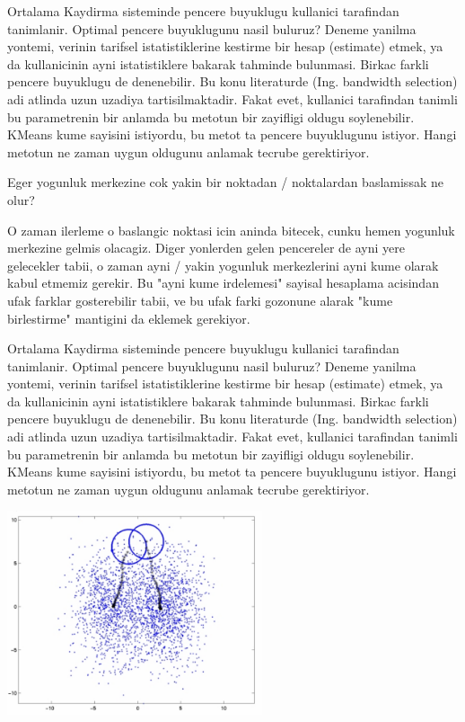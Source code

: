 \documentclass[12pt,fleqn]{article}\usepackage{../common}
\begin{document}
Ortalama Kaydirma sisteminde pencere buyuklugu kullanici tarafindan
tanimlanir.  Optimal pencere buyuklugunu nasil buluruz? Deneme yanilma
yontemi, verinin tarifsel istatistiklerine kestirme bir hesap
(estimate) etmek, ya da kullanicinin ayni istatistiklere bakarak
tahminde bulunmasi. Birkac farkli pencere buyuklugu de denenebilir. Bu
konu literaturde (Ing. bandwidth selection) adi atlinda uzun uzadiya
tartisilmaktadir. Fakat evet, kullanici tarafindan tanimli bu
parametrenin bir anlamda bu metotun bir zayifligi oldugu soylenebilir. KMeans
kume sayisini istiyordu, bu metot ta pencere buyuklugunu istiyor. Hangi
metotun ne zaman uygun oldugunu anlamak tecrube gerektiriyor. 

Eger yogunluk merkezine cok yakin bir noktadan / noktalardan
baslamissak ne olur?

O zaman ilerleme o baslangic noktasi icin aninda bitecek, cunku hemen
yogunluk merkezine gelmis olacagiz. Diger yonlerden gelen pencereler
de ayni yere gelecekler tabii, o zaman ayni / yakin yogunluk
merkezlerini ayni kume olarak kabul etmemiz gerekir. Bu "ayni kume
irdelemesi" sayisal hesaplama acisindan ufak farklar gosterebilir
tabii, ve bu ufak farki gozonune alarak "kume birlestirme" mantigini da
eklemek gerekiyor.

Ortalama Kaydirma sisteminde pencere buyuklugu kullanici tarafindan
tanimlanir.  Optimal pencere buyuklugunu nasil buluruz? Deneme yanilma
yontemi, verinin tarifsel istatistiklerine kestirme bir hesap
(estimate) etmek, ya da kullanicinin ayni istatistiklere bakarak
tahminde bulunmasi. Birkac farkli pencere buyuklugu de denenebilir. Bu
konu literaturde (Ing. bandwidth selection) adi atlinda uzun uzadiya
tartisilmaktadir. Fakat evet, kullanici tarafindan tanimli bu
parametrenin bir anlamda bu metotun bir zayifligi oldugu soylenebilir. KMeans
kume sayisini istiyordu, bu metot ta pencere buyuklugunu istiyor. Hangi
metotun ne zaman uygun oldugunu anlamak tecrube gerektiriyor. 

\includegraphics[height=6cm]{start.png}
\end{document}
